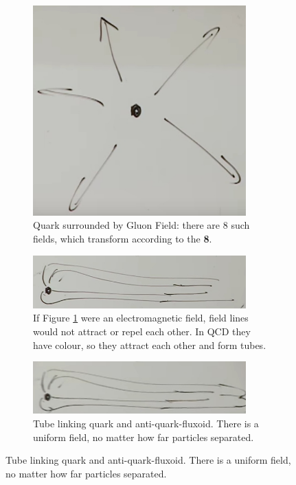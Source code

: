 \documentclass[]{article}
\begin{document}
\begin{figure}[H]
	\caption{Why QCD is more complicated than QED}\label{fig:QCD:QED}
	\begin{subfigure}{0.45\textwidth}
		\caption[Quark surrounded by Gluon Field]{Quark surrounded by Gluon Field: there are 8 such fields, which transform according to the {\bfseries 8}.}\label{fig:2-4-quark-gluon-field}
		\includegraphics[width=0.9\textwidth]{2-4-quark-gluon-field}
	\end{subfigure}
	\begin{subfigure}{0.45\textwidth}
		\caption{If Figure \ref{fig:2-4-quark-gluon-field} were an electromagnetic field, field lines would not attract or repel each other. In QCD they have colour, so they attract each other and form tubes.}
		\includegraphics[width=0.9\textwidth]{2-4-quark-gluon-field-tubes}
	\end{subfigure}
	\begin{subfigure}{0.45\textwidth}
		\caption{Tube linking quark and anti-quark-fluxoid. There is a uniform field, no matter how far particles separated.}
		\includegraphics[width=0.9\textwidth]{2-4-quark-gluon-field-tubes-QAQ}

\end{subfigure}
\end{figure}
\end{document}
